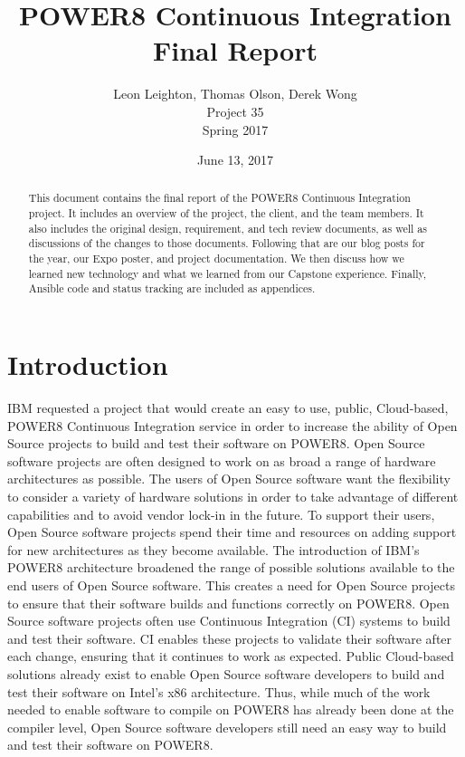\documentclass[10pt,letterpaper,onecolumn,draftclsnofoot]{IEEEtran}
\begin{document}
\begin{titlepage}
  \title{POWER8 Continuous Integration\\ Final Report}
  \author{Leon Leighton, Thomas Olson, Derek Wong\\Project 35\\Spring 2017}
  \date{June 13, 2017}
  \maketitle
  \vspace{4cm}
  \begin{abstract}
  \noindent This document contains the final report of the POWER8 Continuous Integration project.
    It includes an overview of the project, the client, and the team members. It also includes
    the original design, requirement, and tech review documents, as well as discussions of the 
    changes to those documents. Following that are our blog posts for the year, our Expo poster,
    and project documentation. We then discuss how we learned new technology and what we learned
    from our Capstone experience. Finally, Ansible code and status tracking are included as appendices.
 \end{abstract}
\end{titlepage}

\setcounter{tocdepth}{2}
\tableofcontents
\clearpage
\section{Introduction}
IBM requested a project that would create an easy to use, public, Cloud-based, 
POWER8 Continuous Integration service in order to increase the ability
of Open Source projects to build and test their software on POWER8.
Open Source software projects are often designed to work on as broad a range of hardware architectures as possible. 
The users of Open Source software want the flexibility to consider a variety of hardware solutions in order to take advantage of different capabilities and to avoid vendor lock-in in the future. 
To support their users, Open Source software projects spend their time and resources on adding support for new architectures as they become available. 
The introduction of IBM's POWER8 architecture broadened the range of possible solutions available to the end users of Open Source software. 
This creates a need for Open Source projects to ensure that their software builds and functions correctly on POWER8. 
Open Source software projects often use Continuous Integration (CI) systems to build and test their software. 
CI enables these projects to validate their software after each change, ensuring that it continues to work as expected. 
Public Cloud-based solutions already exist to enable Open Source software developers to build and test their software on Intel's x86 architecture. 
Thus, while much of the work needed to enable software to compile on POWER8 has already been done at the compiler level, Open Source software developers still need an easy way to build and test their software on POWER8. \\
\end{document}
